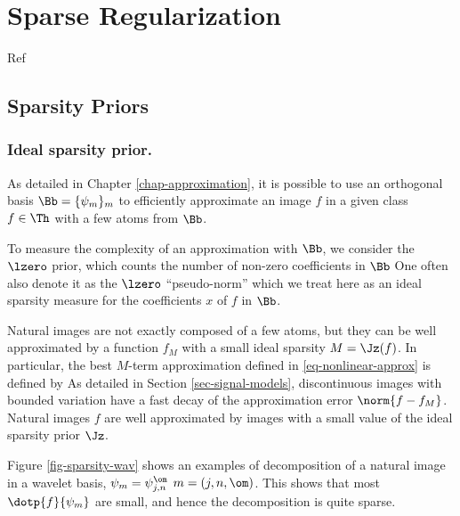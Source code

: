 
\chapter{Sparse Regularization}
\label{chap-sparse-regul}

Ref \cite{mallat2008wavelet,starck2015sparse,scherzer2009variational}


\section{Sparsity Priors}

\subsection{Ideal sparsity prior.}

As detailed in Chapter \ref{chap-approximation}, it is possible to use an orthogonal basis $\Bb = \{ \psi_m \}_m$ to efficiently approximate an image $f$ in a given class $f \in \Th$ with a few atoms from $\Bb$. 

To measure the complexity of an approximation with $\Bb$, we consider the $\lzero$ prior, which counts the number of non-zero coefficients in $\Bb$
One often also denote it as the $\lzero$ ``pseudo-norm''
which we treat here as an ideal sparsity measure for the coefficients $x$ of $f$ in $\Bb$.

Natural images are not exactly composed of a few atoms, but they can be well approximated by a function $f_M$ with a small ideal sparsity $M=\Jz(f)$. In particular, the best $M$-term approximation defined in \eqref{eq-nonlinear-approx} is defined by
As detailed in Section \ref{sec-signal-models}, discontinuous images with bounded variation have a fast decay of the approximation error $\norm{f-f_M}$. Natural images $f$ are well approximated by images with a small value of the ideal sparsity prior $\Jz$.

Figure \ref{fig-sparsity-wav} shows an examples of decomposition of a natural image in a wavelet basis, $\psi_m = \psi_{j,n}^\om$ $m=(j,n,\om)$. This shows that most $\dotp{f}{\psi_m}$ are small, and hence the decomposition is quite sparse.

